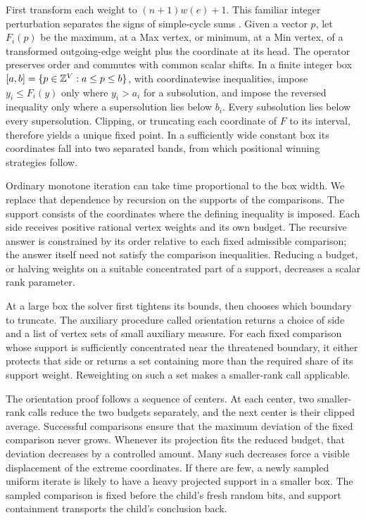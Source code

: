First transform each weight to $(n+1)w(e)+1$. This familiar integer
perturbation separates the signs of simple-cycle sums
\cite[Section~9]{BjorklundVorobyov2007}. Given a vector $p$, let $F_i(p)$
be the maximum, at a Max vertex, or minimum, at a Min vertex, of a
transformed outgoing-edge weight plus the coordinate at its head.
The operator preserves order and commutes with common scalar shifts.
In a finite integer box $[a,b]=\{p\in\mathbb Z^V:a\le p\le b\}$,
with coordinatewise inequalities, impose $y_i\le F_i(y)$ only where
$y_i>a_i$ for a subsolution, and impose the reversed inequality only
where a supersolution lies below $b_i$. Every subsolution lies below
every supersolution. Clipping, or truncating each coordinate of $F$ to its interval, therefore
yields a unique
fixed point. In a sufficiently wide constant box its coordinates fall
into two separated bands, from which positional winning strategies
follow.

Ordinary monotone iteration can take time proportional to the box width.
We replace that dependence by recursion on the supports of the
comparisons. The support consists of the coordinates where the defining
inequality is imposed. Each side receives positive rational vertex
weights and its own budget. The recursive answer is constrained by its
order relative to each fixed admissible comparison; the answer itself
need not satisfy the comparison inequalities. Reducing a budget, or
halving weights on a suitable concentrated part of a support, decreases
a scalar rank parameter.

At a large box the solver first tightens its bounds, then chooses which
boundary to truncate. The auxiliary procedure called orientation returns
a choice of side and a list of vertex sets of small auxiliary measure.
For each fixed comparison whose support is sufficiently concentrated
near the threatened boundary, it either protects that side or returns a
set containing more than the required share of its support weight.
Reweighting on such a set makes a smaller-rank call applicable.

The orientation proof follows a sequence of centers. At each center,
two smaller-rank calls reduce the two budgets separately, and the next
center is their clipped average. Successful comparisons ensure that the
maximum deviation of the fixed comparison never grows. Whenever its
projection fits the reduced budget, that deviation decreases by a
controlled amount. Many such decreases force a visible displacement of
the extreme coordinates. If there are few, a newly sampled uniform
iterate is likely to have a heavy projected support in a smaller box.
The sampled comparison is fixed before the child's fresh random bits,
and support containment transports the child's conclusion back.

